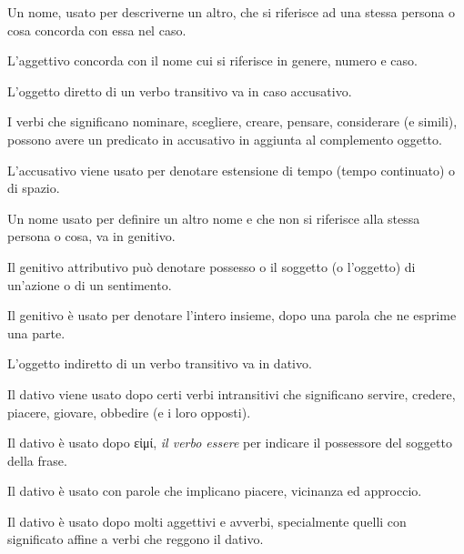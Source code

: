 \documentclass[nols]{tufte-handout}
\newcommand{\didobf}[1]{{\GFSDidotBf #1}}
\begin{document}
 Un nome, usato per descriverne un altro, che si 
riferisce ad una stessa persona o cosa concorda con essa nel caso.

 L'aggettivo concorda con il nome cui
si riferisce in genere, numero e caso.

 L'oggetto diretto di un verbo transitivo va in caso accusativo.

 I verbi che
significano nominare, scegliere, creare, pensare, considerare (e simili),
possono avere un predicato in accusativo in aggiunta al complemento oggetto.

 L'accusativo viene usato per denotare estensione di tempo (tempo continuato) o di spazio.

 Un nome usato per definire un altro nome e che non si riferisce alla stessa persona o cosa, va in genitivo.

 Il genitivo attributivo può denotare possesso o il soggetto (o l'oggetto) di un'azione o di un sentimento.

 Il genitivo è usato per denotare l'intero insieme, dopo una parola che ne esprime una parte.

 L'oggetto indiretto di un verbo transitivo va in dativo.

 Il dativo viene usato dopo certi verbi intransitivi che significano servire, credere, piacere, giovare, obbedire (e i loro opposti).

 Il dativo è usato dopo \didobf{εἰμί}, \textit{il verbo essere} per indicare il possessore del soggetto della frase.

 Il dativo è usato con parole che implicano piacere, vicinanza ed approccio.

 Il dativo è usato dopo molti aggettivi e avverbi, specialmente quelli con significato affine a verbi che reggono il dativo.

\end{document}
